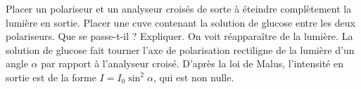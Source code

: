 \begin{quest}
  \QR Placer un polariseur et un analyseur croisés de sorte à éteindre complètement la lumière en sortie. Placer une cuve contenant la solution de glucose entre les deux polariseurs. Que se passe-t-il ? Expliquer.
  {
    On voit réapparaître de la lumière. La solution de glucose fait tourner l'axe de polarisation rectiligne de la lumière d’un angle $\alpha$ par rapport à l’analyseur croisé. D’après la loi de Malus, l’intensité en sortie est de la forme $I = I_0 \sin^2\alpha$, qui est non nulle. 
  }
\end{quest}




